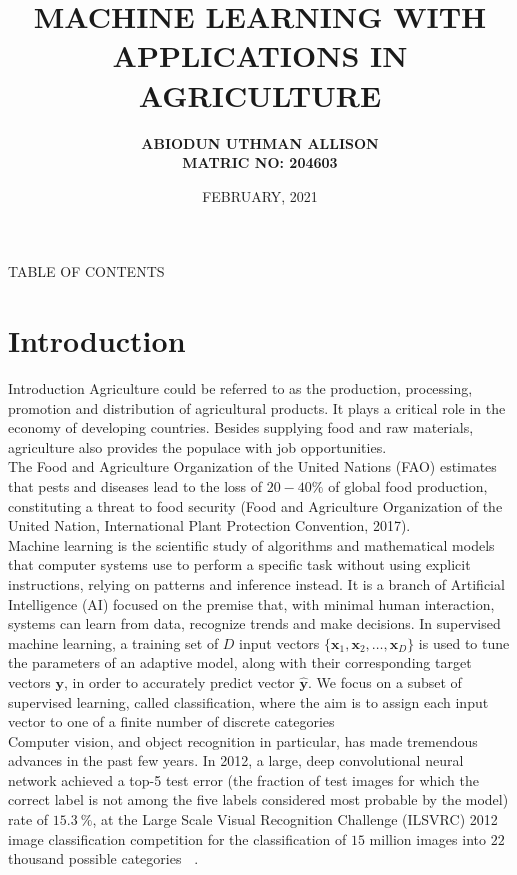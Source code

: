 \documentclass[pdf]{beamer}
\title{MACHINE LEARNING WITH APPLICATIONS IN AGRICULTURE}
\date[2021]{FEBRUARY, 2021}
\author[ABIODUN ALLISON]{\textbf{ABIODUN UTHMAN ALLISON \texorpdfstring{\\ MATRIC NO: 204603}{}}}
\institute{\textbf{A M.Sc. RESEARCH PROJECT SUBMITTED TO THE
DEPARTMENT OF MATHEMATICS, FACULTY OF SCIENCE,
UNIVERSITY OF IBADAN, IBADAN, NIGERIA.}\\ \vskip 0.3cm
\textbf{SUPERVISOR: PROF. G.O.S. EKHAGUERE}}
\begin{document}
\frame{\maketitle} %

\begin{frame}{TABLE OF CONTENTS}
\tableofcontents
\end{frame}


\section{Introduction}
\begin{frame}[allowframebreaks]{Introduction}
\small
Agriculture could be referred to as the production, processing, promotion and distribution of agricultural products. It plays a critical role in the economy of developing countries. Besides supplying food and raw materials, agriculture also provides the populace with job opportunities. \\
The Food and Agriculture Organization of the United Nations (FAO) estimates that pests and diseases lead to the loss of $20 - 40 \%$ of global food production, constituting a threat to food security (Food and Agriculture Organization of the United Nation, International Plant Protection Convention, 2017). \\
Machine learning is the scientific study of algorithms and mathematical models that computer systems use to perform a specific task without using explicit instructions, relying on patterns and inference instead. It is a branch of Artificial Intelligence (AI) focused on the premise that, with minimal human interaction, systems can learn from data, recognize trends and make decisions. In supervised machine learning, a training set of $D$ input  vectors $\{\bm{x}_1, \bm{x}_2, \hdots , \bm{x}_D\}$ is used to tune the parameters of an adaptive model, along with their corresponding target vectors $\bm{y}$, in order to accurately predict vector $\hat{\bm{y}}$. We focus on a subset of supervised learning, called classification, where the aim is to assign each input vector to one of a finite number of discrete categories \\
Computer vision, and object recognition in particular, has made tremendous advances in the past few years. In 2012, a large, deep convolutional neural network achieved a top-5 test error (the fraction of test images for which the correct label is not among the five labels considered most probable by the model) rate of $15.3\ \%$, at the Large Scale Visual Recognition Challenge (ILSVRC) 2012 image classification competition for the classification of $15$ million images into $22$ thousand possible categories \textbf{~\cite{Krizhevsky}}. 
\end{frame}
\end{document}
